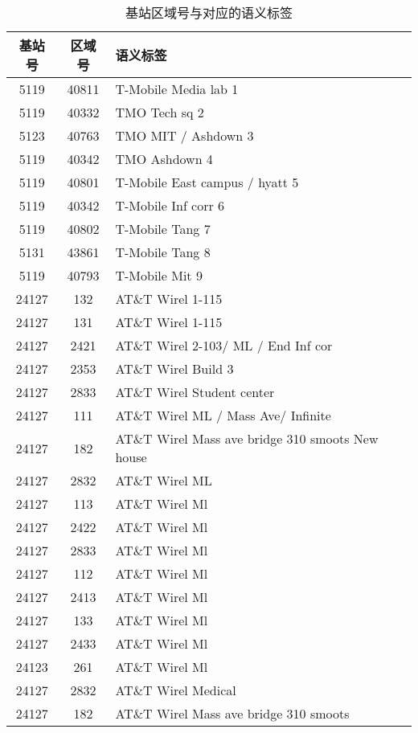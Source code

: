 \begin{table}[htbp]
  \centering
  \caption[基站区域号与对应的语义标签]{基站区域号与对应的语义标签}
  \label{tab:baseSemantic}
    \begin{tabular}{ccl}%
      \toprule[1.5pt]
      基站号 & 区域号 & 语义标签\\
      \midrule[1pt]
      5119 & 40811 & T-Mobile Media lab 1\\
      5119 & 40332 & TMO Tech sq 2\\
      5123 & 40763 & TMO MIT / Ashdown 3\\
      5119 & 40342 & TMO Ashdown 4\\
      5119 & 40801 & T-Mobile East campus / hyatt 5\\
      5119 & 40342 & T-Mobile Inf corr 6\\
      5119 & 40802 & T-Mobile Tang 7\\
      5131 & 43861 & T-Mobile Tang 8\\
      5119 & 40793 & T-Mobile Mit 9\\
      24127 & 132 & AT\&T Wirel 1-115\\
      24127 & 131 & AT\&T Wirel 1-115\\
      24127 & 2421 & AT\&T Wirel 2-103/ ML / End Inf cor\\
      24127 & 2353 & AT\&T Wirel Build 3\\
      24127 & 2833 & AT\&T Wirel Student center\\
      24127 & 111 & AT\&T Wirel ML / Mass Ave/ Infinite\\
      24127 & 182 & AT\&T Wirel Mass ave bridge 310 smoots \/ New house\\
      24127 & 2832 & AT\&T Wirel ML\\
      24127 & 113 & AT\&T Wirel Ml\\
      24127 & 2422 & AT\&T Wirel Ml\\
      24127 & 2833 & AT\&T Wirel Ml\\
      24127 & 112 & AT\&T Wirel Ml\\
      24127 & 2413 & AT\&T Wirel Ml\\
      24127 & 133 & AT\&T Wirel Ml\\
      24127 & 2433 & AT\&T Wirel Ml\\
      24123 & 261 & AT\&T Wirel Ml\\
      24127 & 2832 & AT\&T Wirel Medical\\
      24127 & 182 & AT\&T Wirel Mass ave bridge 310 smoots\\
      \bottomrule[1.5pt]
    \end{tabular}
\end{table}
